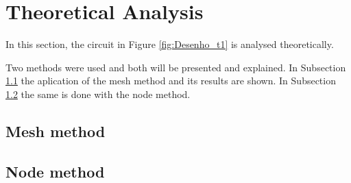 
\section{Theoretical Analysis}
\label{sec:analysis}



In this section, the circuit in Figure \ref{fig:Desenho_t1} is analysed theoretically.

Two methods were used and both will be presented and explained. In Subsection \ref{subsec:mesh_met}
the aplication of the mesh method and its results are shown. In Subsection \ref{subsec:node_met} the
same is done with the  node method.




\subsection{Mesh method}
\label{subsec:mesh_met}







\subsection{Node method}
\label{subsec:node_met}

